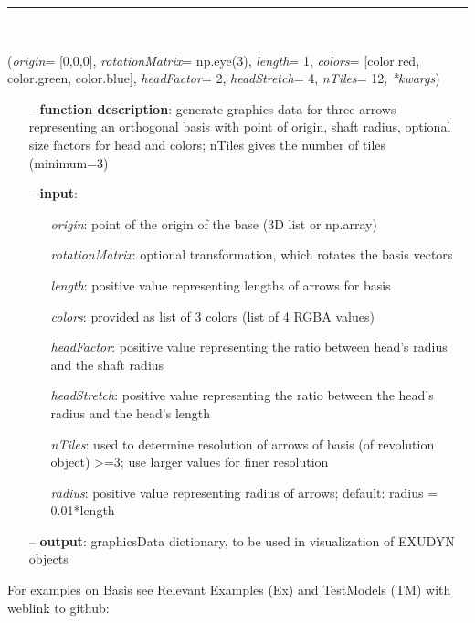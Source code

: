 \begin{itemize}[leftmargin=1.4cm]
\begin{itemize}[leftmargin=1.4cm]
\begin{itemize}[leftmargin=1.4cm]
\begin{itemize}[leftmargin=0.5cm]
\begin{itemize}[leftmargin=1.4cm]
\begin{itemize}[leftmargin=1.4cm]
\begin{itemize}[leftmargin=0.5cm]
\begin{itemize}[leftmargin=1.4cm]
%
\noindent\rule{8cm}{0.75pt}\vspace{1pt} \\ 
\begin{flushleft}
\label{sec:graphics:Basis}
({\it origin}= [0,0,0], {\it rotationMatrix}= np.eye(3), {\it length}= 1, {\it colors}= [color.red, color.green, color.blue], {\it headFactor}= 2, {\it headStretch}= 4, {\it nTiles}= 12, {\it **kwargs})
\end{flushleft}
\setlength{\itemindent}{0.7cm}
\begin{itemize}[leftmargin=0.7cm]
\item[--]
{\bf function description}: generate graphics data for three arrows representing an orthogonal basis with point of origin, shaft radius, optional size factors for head and colors; nTiles gives the number of tiles (minimum=3)
\item[--]
{\bf input}: \vspace{-6pt}
\begin{itemize}[leftmargin=1.2cm]
\setlength{\itemindent}{-0.7cm}
\item[]{\it origin}: point of the origin of the base (3D list or np.array)
\item[]{\it rotationMatrix}: optional transformation, which rotates the basis vectors
\item[]{\it length}: positive value representing lengths of arrows for basis
\item[]{\it colors}: provided as list of 3 colors (list of 4 RGBA values)
\item[]{\it headFactor}: positive value representing the ratio between head's radius and the shaft radius
\item[]{\it headStretch}: positive value representing the ratio between the head's radius and the head's length
\item[]{\it nTiles}: used to determine resolution of arrows of basis (of revolution object) >=3; use larger values for finer resolution
\item[]{\it radius}: positive value representing radius of arrows; default: radius = 0.01*length
\end{itemize}
\item[--]
{\bf output}: graphicsData dictionary, to be used in visualization of EXUDYN objects
\vspace{12pt}\end{itemize}
%
%
\noindent For examples on Basis see Relevant Examples (Ex) and TestModels (TM) with weblink to github:

\end{itemize}
\end{itemize}
\end{itemize}
\end{itemize}
\end{itemize}
\end{itemize}
\end{itemize}
\end{itemize}
